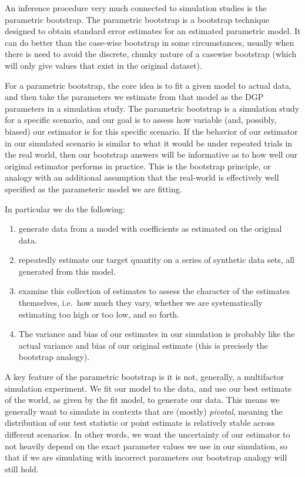 \documentclass[
]{book}
\providecommand{\tightlist}{%
  \setlength{\itemsep}{0pt}\setlength{\parskip}{0pt}}
\begin{document}
An inference procedure very much connected to simulation studies is the parametric bootstrap.
The parametric bootstrap is a bootstrap technique designed to obtain standard error estimates for an estimated parametric model.
It can do better than the case-wise bootstrap in some circumstances, usually when there is need to avoid the discrete, chunky nature of a casewise bootstrap (which will only give values that exist in the original dataset).

For a parametric bootstrap, the core idea is to fit a given model to actual data, and then take the parameters we estimate from that model as the DGP parameters in a simulation study.
The parametric bootstrap is a simulation study for a specific scenario, and our goal is to assess how variable (and, possibly, biased) our estimator is for this specific scenario.
If the behavior of our estimator in our simulated scenario is similar to what it would be under repeated trials in the real world, then our bootstrap answers will be informative as to how well our original estimator performs in practice.
This is the bootstrap principle, or analogy with an additional assumption that the real-world is effectively well specified as the parameteric model we are fitting.

In particular we do the following:

\begin{enumerate}
\def\labelenumi{\arabic{enumi}.}
\tightlist
\item
  generate data from a model with coefficients as estimated on the original data.
\item
  repeatedly estimate our target quantity on a series of synthetic data sets, all generated from this model.
\item
  examine this collection of estimates to assess the character of the estimates themselves, i.e.~how much they vary, whether we are systematically estimating too high or too low, and so forth.
\item
  The variance and bias of our estimates in our simulation is probably like the actual variance and bias of our original estimate (this is precisely the bootstrap analogy).
\end{enumerate}

A key feature of the parametric bootstrap is it is not, generally, a multifactor simulation experiment.
We fit our model to the data, and use our best estimate of the world, as given by the fit model, to generate our data.
This means we generally want to simulate in contexts that are (mostly) \emph{pivotal}, meaning the distribution of our test statistic or point estimate is relatively stable across different scenarios.
In other words, we want the uncertainty of our estimator to not heavily depend on the exact parameter values we use in our simulation, so that if we are simulating with incorrect parameters our bootstrap analogy will still hold.
\end{document}
